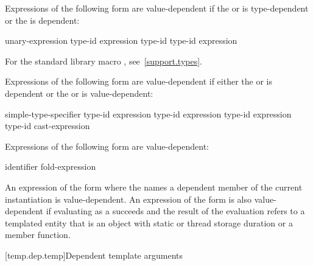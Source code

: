 Expressions of the following form are value-dependent if the
 or 
is type-dependent or the
is dependent:
\begin{ncsimplebnf}
 unary-expression\br
{} \terminal{(} type-id \terminal{)}\br
{} \terminal{(} expression \terminal{)}\br
{} \terminal{(} type-id \terminal{)}\br
{} \terminal{(} type-id \terminal{)}\br
{} \terminal{(} expression \terminal{)}
\end{ncsimplebnf}

\begin{note}
For the standard library macro ,
see~\ref{support.types}.
\end{note}

\pnum
Expressions of the following form are value-dependent if either the
or
is dependent or the
or
is value-dependent:
\begin{ncsimplebnf}
simple-type-specifier \terminal{(}  \terminal{)}\br
{} \terminal{<} type-id \terminal{>} \terminal{(} expression \terminal{)}\br
{} \terminal{<} type-id \terminal{>} \terminal{(} expression \terminal{)}\br
{} \terminal{<} type-id \terminal{>} \terminal{(} expression \terminal{)}\br
\terminal{(} type-id \terminal{)} cast-expression
\end{ncsimplebnf}

\pnum
Expressions of the following form are value-dependent:
\begin{ncsimplebnf}
  \terminal{(} identifier \terminal{)}\br
fold-expression
\end{ncsimplebnf}

\pnum
An expression of the form \tcode{\&} where the
 names a dependent member of the current
instantiation is value-dependent.
An expression of the form \tcode{\&}
is also value-dependent if evaluating 
as a  succeeds and
the result of the evaluation refers to a templated entity
that is an object with static or thread storage duration or a member function.

[temp.dep.temp]{Dependent template arguments}

